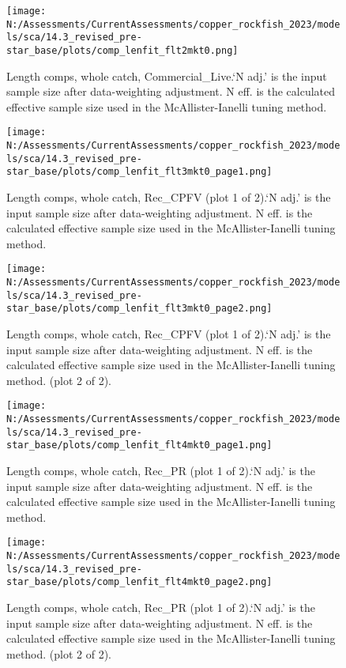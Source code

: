 \documentclass[11pt,
  english,
  letterpaper,
]{article}
\begin{document}
\begin{figure}
\centering
\texttt{[image: N:/Assessments/CurrentAssessments/copper\_rockfish\_2023/models/sca/14.3\_revised\_pre-star\_base/plots/comp\_lenfit\_flt2mkt0.png]}
\caption{Length comps, whole catch, Commercial\_Live.`N adj.' is the input sample size after data-weighting adjustment. N eff. is the calculated effective sample size used in the McAllister-Ianelli tuning method.\label{fig:comp_lenfit_flt2mkt0}}
\end{figure}

\begin{figure}
\centering
\texttt{[image: N:/Assessments/CurrentAssessments/copper\_rockfish\_2023/models/sca/14.3\_revised\_pre-star\_base/plots/comp\_lenfit\_flt3mkt0\_page1.png]}
\caption{Length comps, whole catch, Rec\_CPFV (plot 1 of 2).`N adj.' is the input sample size after data-weighting adjustment. N eff. is the calculated effective sample size used in the McAllister-Ianelli tuning method.\label{fig:comp_lenfit_flt3mkt0_page1}}
\end{figure}

\begin{figure}
\centering
\texttt{[image: N:/Assessments/CurrentAssessments/copper\_rockfish\_2023/models/sca/14.3\_revised\_pre-star\_base/plots/comp\_lenfit\_flt3mkt0\_page2.png]}
\caption{Length comps, whole catch, Rec\_CPFV (plot 1 of 2).`N adj.' is the input sample size after data-weighting adjustment. N eff. is the calculated effective sample size used in the McAllister-Ianelli tuning method. (plot 2 of 2).\label{fig:comp_lenfit_flt3mkt0_page2}}
\end{figure}

\begin{figure}
\centering
\texttt{[image: N:/Assessments/CurrentAssessments/copper\_rockfish\_2023/models/sca/14.3\_revised\_pre-star\_base/plots/comp\_lenfit\_flt4mkt0\_page1.png]}
\caption{Length comps, whole catch, Rec\_PR (plot 1 of 2).`N adj.' is the input sample size after data-weighting adjustment. N eff. is the calculated effective sample size used in the McAllister-Ianelli tuning method.\label{fig:comp_lenfit_flt4mkt0_page1}}
\end{figure}

\begin{figure}
\centering
\texttt{[image: N:/Assessments/CurrentAssessments/copper\_rockfish\_2023/models/sca/14.3\_revised\_pre-star\_base/plots/comp\_lenfit\_flt4mkt0\_page2.png]}
\caption{Length comps, whole catch, Rec\_PR (plot 1 of 2).`N adj.' is the input sample size after data-weighting adjustment. N eff. is the calculated effective sample size used in the McAllister-Ianelli tuning method. (plot 2 of 2).\label{fig:comp_lenfit_flt4mkt0_page2}}
\end{figure}
\end{document}
